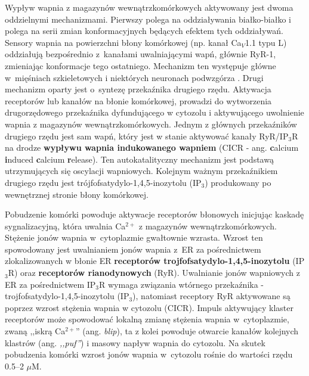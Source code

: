 Wypływ wapnia z magazynów wewnątrzkomórkowych aktywowany jest dwoma oddzielnymi mechanizmami. Pierwszy polega na oddziaływania białko-białko i polega na serii zmian konformacyjnych będących efektem tych oddziaływań. Sensory wapnia na powierzchni błony komórkowej (np. kanał Ca$_V$1.1 typu L) oddziałują bezpośrednio z~kanałami uwalniającymi wapń, głównie RyR-1, zmieniając konformacje tego ostatniego. Mechanizm ten występuje główne w~mięśniach szkieletowych i niektórych neuronach podwzgórza \cite{Berridge2012b}. Drugi mechanizm oparty jest o~syntezę przekaźnika drugiego rzędu. Aktywacja receptorów lub kanałów na błonie komórkowej, prowadzi do wytworzenia drugorzędowego przekaźnika dyfundującego w cytozolu i aktywującego uwolnienie wapnia z magazynów wewnątrzkomórkowych. Jednym z głównych przekaźników drugiego rzędu jest sam wapń, który jest w stanie aktywować kanały RyR/IP$_3$R na drodze \textbf{wypływu wapnia indukowanego wapniem} (CICR - ang. \textbf{c}alcium \textbf{i}nduced \textbf{c}alcium \textbf{r}elease). Ten autokatalityczny mechanizm jest podstawą utrzymujących się oscylacji wapniowych. Kolejnym ważnym przekaźnikiem drugiego rzędu jest trójfofsatydylo-1,4,5-inozytolu (IP$_3$) produkowany po wewnętrznej stronie błony komórkowej.

Pobudzenie komórki powoduje aktywacje receptorów błonowych inicjując kaskadę sygnalizacyjną, która uwalnia Ca$^{2+}$ z magazynów wewnątrzkomórkowych. Stężenie jonów wapnia w~cytoplazmie gwałtownie wzrasta. Wzrost ten spowodowany jest uwalnianiem jonów wapnia z~ER za pośrednictwem zlokalizowanych w błonie ER \textbf{receptorów trojfofsatydylo-1,4,5-inozytolu} (IP$_3$R) oraz \textbf{receptorów rianodynowych} (RyR). Uwalnianie jonów wapniowych z ER za pośrednictwem IP$_3$R wymaga związania wtórnego przekaźnika - trojfofsatydylo-1,4,5-inozytolu (IP$_3$), natomiast receptory RyR aktywowane są poprzez wzrost stężenia wapnia w cytozolu (CICR). Impuls aktywujący klaster receptorów może spowodować lokalną zmianę stężenia wapnia w~cytoplazmie, zwaną ,,iskrą Ca$^{2+}$'' (ang. \textit{blip}), ta z kolei powoduje otwarcie kanałów kolejnych klastrów (ang. \textit{,,puf''}) \cite{Foskett2007} i masowy napływ wapnia do cytozolu. Na skutek pobudzenia komórki wzrost jonów wapnia w~cytozolu rośnie do wartości rzędu 0.5--2 $\mu$M.

